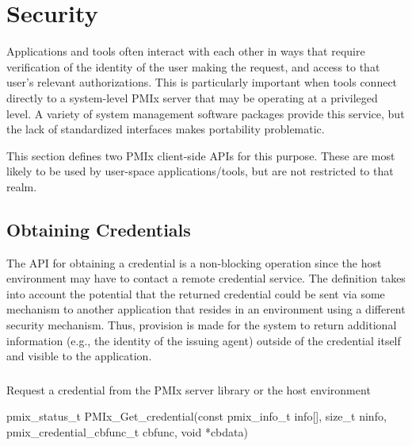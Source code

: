 \chapter{Security}
\label{chap:api_security}

Applications and tools often interact with each other in ways that require verification of the identity of the user making the request, and access to that user's relevant authorizations. This is particularly important when tools connect directly to a system-level \ac{PMIx} server that may be operating at a privileged level. A variety of system management software packages provide this service, but the lack of standardized interfaces makes portability problematic.

This section defines two \ac{PMIx} client-side \acp{API} for this purpose. These are most likely to be used by user-space applications/tools, but are not restricted to that realm.


\section{Obtaining Credentials}
\label{chap:api_security:obtain}

The \ac{API} for obtaining a credential is a non-blocking operation since the host environment may have to contact a remote credential service. The definition takes into account the potential that the returned credential could be sent via some mechanism to another application that resides in an environment using a different security mechanism. Thus, provision is made for the system to return additional information (e.g., the identity of the issuing agent) outside of the credential itself and visible to the application.

\subsection{}

\summary

Request a credential from the \ac{PMIx} server library or the host environment

\format

\cspecificstart
\begin{codepar}
pmix_status_t PMIx_Get_credential(const pmix_info_t info[], size_t ninfo,
                             pmix_credential_cbfunc_t cbfunc, void *cbdata)
\end{codepar}
\cspecificend

